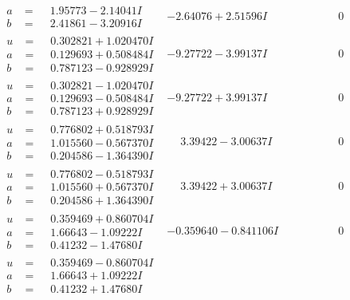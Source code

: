 \documentclass[1p]{elsarticle_modified}
\theoremstyle{definition}
\begin{document}
$$\begin{array}{c|c|c}
\begin{aligned}
a &= \phantom{-}1.95773 - 2.14041 I \\
b &= \phantom{-}2.41861 - 3.20916 I\end{aligned}
 & -2.64076 + 2.51596 I & \phantom{-0.000000 } 0 \\ \hline\begin{aligned}
u &= \phantom{-}0.302821 + 1.020470 I \\
a &= \phantom{-}0.129693 + 0.508484 I \\
b &= \phantom{-}0.787123 - 0.928929 I\end{aligned}
 & -9.27722 - 3.99137 I & \phantom{-0.000000 } 0 \\ \hline\begin{aligned}
u &= \phantom{-}0.302821 - 1.020470 I \\
a &= \phantom{-}0.129693 - 0.508484 I \\
b &= \phantom{-}0.787123 + 0.928929 I\end{aligned}
 & -9.27722 + 3.99137 I & \phantom{-0.000000 } 0 \\ \hline\begin{aligned}
u &= \phantom{-}0.776802 + 0.518793 I \\
a &= \phantom{-}1.015560 - 0.567370 I \\
b &= \phantom{-}0.204586 - 1.364390 I\end{aligned}
 & \phantom{-}3.39422 - 3.00637 I & \phantom{-0.000000 } 0 \\ \hline\begin{aligned}
u &= \phantom{-}0.776802 - 0.518793 I \\
a &= \phantom{-}1.015560 + 0.567370 I \\
b &= \phantom{-}0.204586 + 1.364390 I\end{aligned}
 & \phantom{-}3.39422 + 3.00637 I & \phantom{-0.000000 } 0 \\ \hline\begin{aligned}
u &= \phantom{-}0.359469 + 0.860704 I \\
a &= \phantom{-}1.66643 - 1.09222 I \\
b &= \phantom{-}0.41232 - 1.47680 I\end{aligned}
 & -0.359640 - 0.841106 I & \phantom{-0.000000 } 0 \\ \hline\begin{aligned}
u &= \phantom{-}0.359469 - 0.860704 I \\
a &= \phantom{-}1.66643 + 1.09222 I \\
b &= \phantom{-}0.41232 + 1.47680 I\end{aligned}

\end{array}$$
\end{document}
